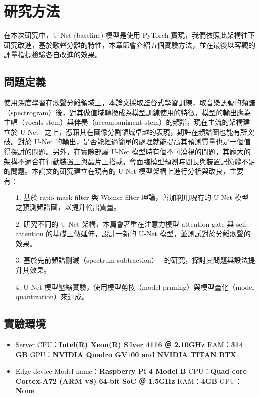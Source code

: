 \chapter{研究方法}

在本次研究中，U-Net (baseline) 模型是使用 PyTorch 實現，我們依照此架構往下研究改進，基於歌聲分離的特性，本章節會介紹五個實驗方法，並在最後以客觀的評量指標檢驗各自改進的效果。

\section{問題定義}
使用深度學習在歌聲分離領域上，本論文採取監督式學習訓練，取音樂訊號的頻譜（spectrogram）後，對其做值域轉換成為模型訓練使用的特徵，模型的輸出應為主唱（vocals stem）與伴奏（accompaniment stem）的頻譜，現在主流的架構建立於 U-Net~\cite{ronneberger2015u,jansson2017singing,hennequin2020spleeter,defossez2019music} 之上，憑藉其在圖像分割領域卓越的表現，期許在頻譜圖也能有所突破。對於 U-Net 的輸出，是否能經過簡單的處理就能提高其預測質量也是一個值得探討的問題。另外，在實際部屬 U-Net 模型時有個不可漠視的問題，其龐大的架構不適合在行動裝置上與晶片上搭載，會面臨模型預測時間長與裝置記憶體不足的問題。本論文的研究建立在現有的 U-Net 模型架構上進行分析與改良，主要有：
\begin{itemize}
	\item[1.] 基於 ratio mask filter 與 Wiener filter 理論，善加利用現有的 U-Net 模型之預測頻譜圖，以提升輸出質量。
	\item[2.] 研究不同的 U-Net 架構，本篇會著重在注意力模型 attention gate 與 self-attention 的基礎上做延伸，設計一新的 U-Net 模型，並測試對於分離歌聲的效果。
	\item[3.] 基於先前頻譜刪減（spectrum subtraction）~\cite{boll1979suppression} 的研究，探討其問題與設法提升其效果。
	\item[4.] U-Net 模型壓縮實驗，使用模型剪枝（model pruning）與模型量化（model quantization）來達成。
\end{itemize}

\section{實驗環境}
\begin{itemize}
    \item Server
    \subitem CPU：{\bf Intel(R) Xeon(R) Silver 4116 ＠ 2.10GHz}
    \subitem RAM：{\bf 314 GB}
    \subitem GPU：{\bf NVIDIA Quadro GV100 and NVIDIA TITAN RTX}
    \item Edge device
    \subitem Model name：{\bf Raspberry Pi 4 Model B}
    \subitem CPU：{\bf Quad core Cortex-A72 (ARM v8) 64-bit SoC ＠ 1.5GHz}
    \subitem RAM：{\bf 4GB}
    \subitem GPU：{\bf None}
\end{itemize}


